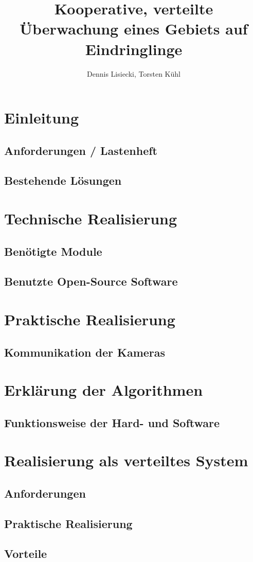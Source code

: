 \documentclass[12pt,a4paper]{scrreprt}
\title{Kooperative, verteilte Überwachung eines Gebiets auf Eindringlinge}
\author{Dennis Lisiecki, Torsten Kühl}
\begin{document}
\maketitle	%
\tableofcontents	%

\chapter{Einleitung}
\section{Anforderungen / Lastenheft}

\section{Bestehende Lösungen}

\chapter{Technische Realisierung}
\section{Benötigte Module}

\section{Benutzte Open-Source Software}

\chapter{Praktische Realisierung}
\section{Kommunikation der Kameras}


\chapter{Erklärung der Algorithmen}
\section{Funktionsweise der Hard- und Software}

\chapter{Realisierung als verteiltes System}
\section{Anforderungen}

\section{Praktische Realisierung}

\section{Vorteile}
\end{document}
